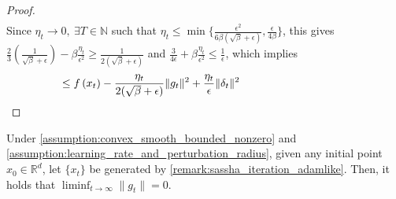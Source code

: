 \begin{proof}
\begin{align*}
    \end{align*}    
    Since $\eta_t \to 0,\ \exists T\in\mathbb{N}$ such that $\eta_t\leq\min\{\frac{\epsilon^2}{6\beta(\sqrt{\beta}+\epsilon)}, \frac{\epsilon}{4\beta}\}$,
    this gives $\frac{2}{3}\left(\frac{1}{\sqrt{\beta}+\epsilon}\right)-\beta\frac{\eta_t}{\epsilon^2}\geq \frac{1}{2(\sqrt{\beta}+\epsilon)}$ and $\frac{3}{4\epsilon} + \beta\frac{\eta_t}{\epsilon^2} \leq \frac{1}{\epsilon}$, which implies
    \begin{align*}
    \hspace{-34mm} \leq f\left(x_t\right)-\frac{\eta_t}{2(\sqrt{\beta}+\epsilon)} \|g_t\|^2 +\frac{\eta_t}{\epsilon} \|\delta_t\|^2     
    \end{align*}
\end{proof}
\begin{theorem}
    Under \cref{assumption:convex_smooth_bounded_nonzero} and \cref{assumption:learning_rate_and_perturbation_radius}, given any initial point $x_0 \in \mathbb{R}^d$, let $\{x_t\}$ be generated by \cref{remark:sassha_iteration_adamlike}. Then, it holds that $\liminf_{t \to \infty} \|g_t\| = 0$.
\end{theorem}
